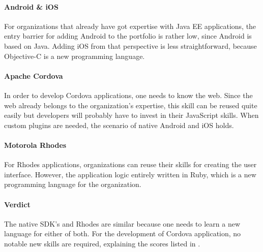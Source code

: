 \paragraph{Android \& iOS} For organizations that already have got  expertise with Java EE applications, the entry barrier for adding Android to the portfolio is rather low, since Android is based on Java. Adding iOS from that perspective is less straightforward, because Objective-C is a new programming language.

\paragraph{Apache Cordova} In order to develop Cordova applications, one needs to know the web. Since the web already belongs to the organization's expertise, this skill can be reused quite easily but developers will probably have to invest in their JavaScript skills. When custom plugins are needed, the scenario of native Android and iOS holds.

\paragraph{Motorola Rhodes} For Rhodes applications, organizations can reuse their skills for creating the user interface. However, the application logic entirely written in Ruby, which is a new programming language for the organization.

\paragraph{Verdict} The native SDK's and Rhodes are similar because one needs to learn a new language for either of both. For the development of Cordova application, no notable new skills are required, explaining the scores listed in .



